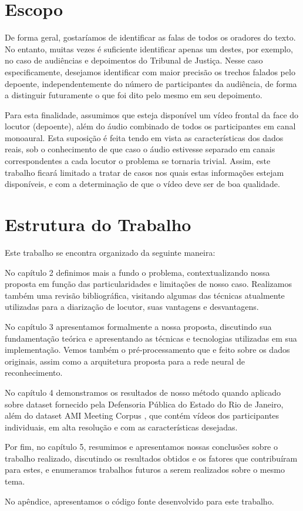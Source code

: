 \section{Escopo}

De forma geral, gostaríamos de identificar as falas de todos os oradores do texto. No entanto, muitas vezes é suficiente identificar apenas um destes, por exemplo, no caso de audiências e depoimentos do Tribunal de Justiça. Nesse caso especificamente, desejamos identificar com maior precisão os trechos falados pelo depoente, independentemente do número de participantes da audiência, de forma a distinguir futuramente o que foi dito pelo mesmo em seu depoimento.

Para esta finalidade, assumimos que esteja disponível um vídeo frontal da face do locutor (depoente), além do áudio combinado de todos os participantes em canal monoaural. Esta suposição é feita tendo em vista as características dos dados reais, sob o conhecimento de que caso o áudio estivesse separado em canais correspondentes a cada locutor o problema se tornaria trivial. Assim, este trabalho ficará limitado a tratar de casos nos quais estas informações estejam disponíveis, e com a determinação de que o vídeo deve ser de boa qualidade.

\section{Estrutura do Trabalho}

Este trabalho se encontra organizado da seguinte maneira:


No capítulo 2 definimos mais a fundo o problema, contextualizando nossa proposta em função das particularidades e limitações de nosso caso. Realizamos também uma revisão bibliográfica, visitando algumas das técnicas atualmente utilizadas para a diarização de locutor, suas vantagens e desvantagens.

No capítulo 3 apresentamos formalmente a nossa proposta, discutindo sua fundamentação teórica e apresentando as técnicas e tecnologias utilizadas em sua implementação. Vemos também o pré-processamento que e feito sobre os dados originais, assim como a arquitetura proposta para a rede neural de reconhecimento.

No capítulo 4 demonstramos os resultados de nosso método quando aplicado sobre dataset fornecido pela Defensoria Pública do Estado do Rio de Janeiro, além do dataset AMI Meeting Corpus \cite{mccowanAMIMeetingCorpus2005}, que contém vídeos dos participantes individuais, em alta resolução e com as características desejadas.

Por fim, no capítulo 5, resumimos e apresentamos nossas conclusões sobre o trabalho realizado, discutindo os resultados obtidos e os fatores que contribuíram para estes, e enumeramos trabalhos futuros a serem realizados sobre o mesmo tema.

No apêndice, apresentamos o código fonte desenvolvido para este trabalho.